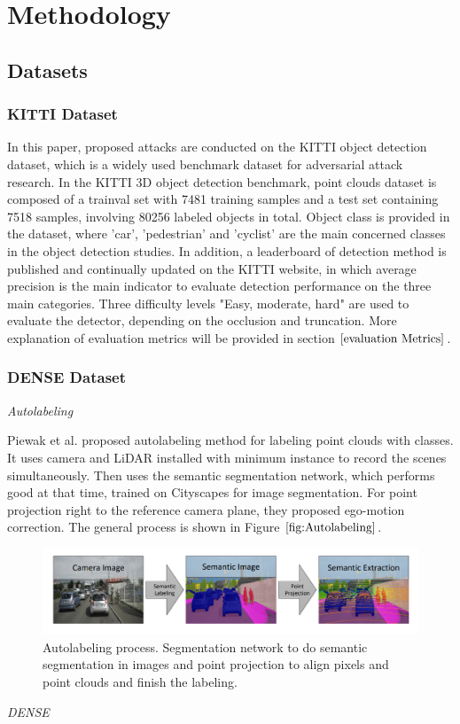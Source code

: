 
\chapter{Methodology}
\label{sec:concepts}
\section{Datasets}
\subsection{KITTI Dataset}
In this paper, proposed attacks are conducted on the KITTI object detection dataset\cite{geiger_vision_2013}, which is a widely used benchmark dataset for adversarial attack research. In the KITTI 3D object detection benchmark, point clouds dataset is composed of a trainval set with 7481 training samples and a test set containing 7518 samples, involving 80256 labeled objects in total. Object class is provided in the dataset, where 'car', 'pedestrian' and 'cyclist' are the main concerned classes in the object detection studies. In addition, a leaderboard of detection method is published and continually updated on the KITTI website\cite{KITTI}, in which average precision is the main indicator to evaluate detection performance on the three main categories. Three difficulty levels "Easy, moderate, hard" are used to evaluate the detector, depending on the occlusion and truncation. More explanation of evaluation metrics will be provided in section \(\ref{evaluation Metrics}\).

\subsection{DENSE Dataset}
\textit{Autolabeling} 

Piewak et al.\cite{piewak_boosting_2018} proposed autolabeling method for labeling point clouds with classes. It uses camera and LiDAR installed with minimum instance to record the scenes simultaneously. Then uses the semantic segmentation network\cite{cordts_understanding_nodate}, which performs good at that time, trained on Cityscapes\cite{cordts_cityscapes_2016} for image segmentation. For point projection right to the reference camera plane, they proposed ego-motion correction. The general process is shown in Figure \(\ref{fig:Autolabeling}\).
\begin{figure}[!htbp]
\centering
\includegraphics[scale=0.5]{Graphics/Autolabeling.png}
\caption{Autolabeling process. Segmentation network to do semantic segmentation in images and point projection to align pixels and point clouds and finish the labeling.\cite{piewak_boosting_2018}}
\label{fig:Autolabeling}
\end{figure}
\textit{DENSE\cite{DENSE}}


